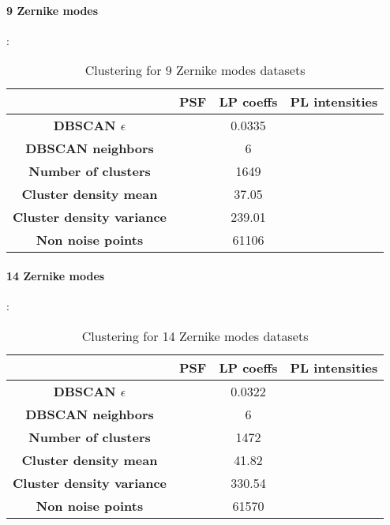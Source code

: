 		\paragraph{9 Zernike modes}:
		\begin{table}[h!]
			\centering
			\begin{tabular}{|c|c|c|c|}
				\hline
				\textbf{} & \textbf{PSF} & \textbf{LP coeffs} & \textbf{PL intensities}\\
				\hline
				\textbf{DBSCAN $\epsilon$} &  & 0.0335 & \\
				\hline
				\textbf{DBSCAN neighbors} &  & 6 & \\
				\hline
				\textbf{Number of clusters} &  & 1649 & \\
				\hline
				\textbf{Cluster density mean} &  & 37.05 & \\
				\hline
				\textbf{Cluster density variance} &  & 239.01 & \\
				\hline
				\textbf{Non noise points} &  & 61106 & \\
				\hline
			\end{tabular}
		\caption{Clustering for 9 Zernike modes datasets}
		\end{table}
		
		\paragraph{14 Zernike modes}:
		\begin{table}[h!]
			\centering
			\begin{tabular}{|c|c|c|c|}
				\hline
				\textbf{} & \textbf{PSF} & \textbf{LP coeffs} & \textbf{PL intensities}\\
				\hline
				\textbf{DBSCAN $\epsilon$} &  & 0.0322 & \\
				\hline
				\textbf{DBSCAN neighbors} &  & 6 & \\
				\hline
				\textbf{Number of clusters} &  & 1472 & \\
				\hline
				\textbf{Cluster density mean} &  & 41.82 & \\
				\hline
				\textbf{Cluster density variance} &  & 330.54 & \\
				\hline
				\textbf{Non noise points} &  & 61570 & \\
				\hline
			\end{tabular}
		\caption{Clustering for 14 Zernike modes datasets}
		\end{table}
		
